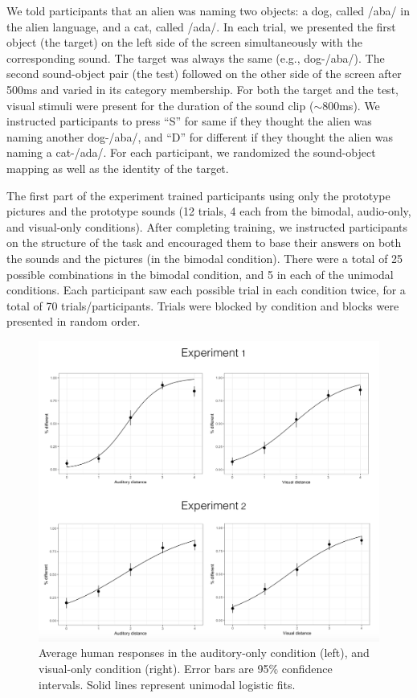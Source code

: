 \documentclass[10pt,letterpaper]{article}
\begin{document}
We told participants that an alien was naming two objects: a dog, called /aba/ in the alien language, and a cat, called /ada/. In each trial, we presented the first object (the target) on the left side of the screen simultaneously with the corresponding sound. The target was always the same (e.g., dog-/aba/). The second sound-object pair (the test) followed on the other side of the screen after 500ms and varied in its category membership. For both the target and the test, visual stimuli were present for the duration of the sound clip ($\sim$800ms). We instructed participants to press ``S'' for same if they thought the alien was naming another dog-/aba/, and ``D'' for different if they thought the alien was naming a cat-/ada/. For each participant, we randomized the sound-object mapping as well as the identity of the target.

The first part of the experiment trained participants using only the prototype pictures and the prototype sounds (12 trials, 4 each from the bimodal, audio-only, and visual-only conditions). After completing training, we instructed participants on the structure of the task and encouraged them to base their answers on both the sounds and the pictures (in the bimodal condition). There were a total of 25 possible combinations in the bimodal condition, and 5 in each of the unimodal conditions. Each participant saw each possible trial in each condition twice, for a total of 70 trials/participants. Trials were blocked by condition and blocks were presented in random order.

\begin{figure}
\centering
\includegraphics[width=3.25in\textwidth]{unimodal.png}
\caption{Average human responses in the auditory-only condition (left), and visual-only condition (right). Error bars are 95\% confidence intervals. Solid lines represent unimodal logistic fits.}
\label{fig:unimodal}
\end{figure}
\end{document}
